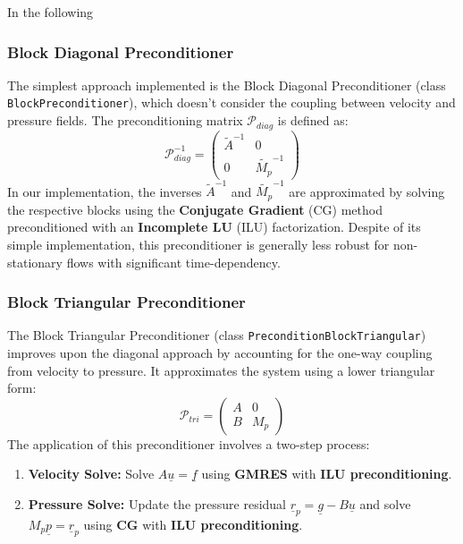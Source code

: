\documentclass[11pt,a4paper]{article}
\renewcommand{\vec}[1]{\underline{#1}} %
\begin{document}
In the following 

\subsubsection{Block Diagonal Preconditioner}

The simplest approach implemented is the Block Diagonal Preconditioner (class \texttt{BlockPreconditioner}), which doesn't consider the coupling between velocity and pressure fields. The preconditioning matrix $\mathcal{P}_{diag}$ is defined as:
\begin{equation}
    \mathcal{P}_{diag}^{-1} = 
    \begin{pmatrix} 
    \tilde{A}^{-1} & 0 \\ 
    0 & \tilde{M_p}^{-1} 
    \end{pmatrix}
\end{equation}
In our implementation, the inverses $\tilde{A}^{-1}$ and $\tilde{M_p}^{-1}$ are approximated by solving the respective blocks using the \textbf{Conjugate Gradient} (CG) method preconditioned with an \textbf{Incomplete LU} (ILU) factorization. Despite of its simple implementation, this preconditioner is generally less robust for non-stationary flows with significant time-dependency.

\subsubsection{Block Triangular Preconditioner}

The Block Triangular Preconditioner (class \texttt{PreconditionBlockTriangular}) improves upon the diagonal approach by accounting for the one-way coupling from velocity to pressure. It approximates the system using a lower triangular form:
\begin{equation}
    \mathcal{P}_{tri} = 
    \begin{pmatrix} 
    A & 0 \\ 
    B & M_p 
    \end{pmatrix}
\end{equation}
The application of this preconditioner involves a two-step process:
\begin{enumerate}
    \item \textbf{Velocity Solve:} Solve $A \vec{u} = \vec{f}$ using \textbf{GMRES} with \textbf{ILU preconditioning}.
    \item \textbf{Pressure Solve:} Update the pressure residual $\vec{r}_p = \vec{g} - B\vec{u}$ and solve $M_p \vec{p} = \vec{r}_p$ using \textbf{CG} with \textbf{ILU preconditioning}.
\end{enumerate}
\end{document}
